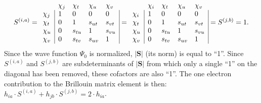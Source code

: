 \begin{equation}
S^{(i,a)}=
\begin{array}{lllll}
 &  \chi_j & \chi_t & \chi_u & \chi_v \\
 \chi_j & \multicolumn{1}{|l}{ 1 } & 0 & 0 & \multicolumn{1}{l|}{ 0 } \\
 \chi_t & \multicolumn{1}{|l}{ 0 } & 1 & s_{ut} & \multicolumn{1}{l|}{ s_{vt} } \\
 \chi_u & \multicolumn{1}{|l}{ 0 } & s_{tu} & 1 & \multicolumn{1}{l|}{s_{vu}} \\
 \chi_v & \multicolumn{1}{|l}{ 0 } & s_{tv} & s_{uv} & \multicolumn{1}{l|}{1}
\end{array}=
\begin{array}{lllll}
 &  \chi_i & \chi_t & \chi_u & \chi_v \\
 \chi_i & \multicolumn{1}{|l}{ 1 } & 0 & 0 & \multicolumn{1}{l|}{ 0 } \\
 \chi_t & \multicolumn{1}{|l}{ 0 } & 1 & s_{ut} & \multicolumn{1}{l|}{ s_{vt} } \\
 \chi_u & \multicolumn{1}{|l}{ 0 } & s_{tu} & 1 & \multicolumn{1}{l|}{s_{vu}} \\
 \chi_v & \multicolumn{1}{|l}{ 0 } & s_{tv} & s_{uv} & \multicolumn{1}{l|}{1}
\end{array}=
S^{(j,b)}=1.
\end{equation}
Since the wave function $\Psi_0$ is normalized, $|\mathbf{S}|$ (its norm) is equal to ``1''. Since  $S^{(i,a)}$ and $S^{(j,b)}$ are subdeterminants of $|\mathbf{S}|$ from which only a single ``1'' on the diagonal has been removed, these cofactors are also ``1''. The one electron contribution to the Brillouin matrix element is then: $h_{ia}\cdot S^{(i,a)} + h_{jb}\cdot S^{(j,b)} = 2 \cdot h_{ia}$.

